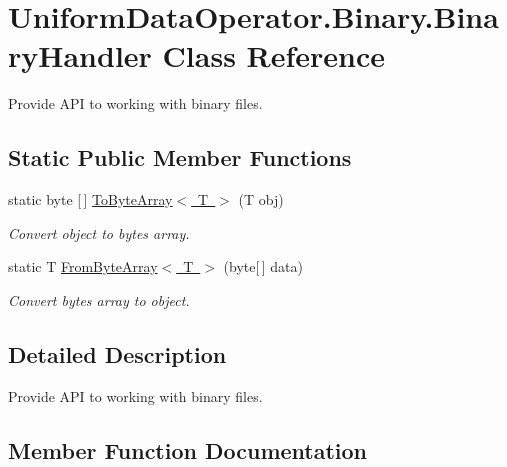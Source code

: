 \hypertarget{class_uniform_data_operator_1_1_binary_1_1_binary_handler}{}\section{Uniform\+Data\+Operator.\+Binary.\+Binary\+Handler Class Reference}
\label{class_uniform_data_operator_1_1_binary_1_1_binary_handler}


Provide A\+PI to working with binary files.  


\subsection*{Static Public Member Functions}
\begin{DoxyCompactItemize}
\item 
static byte \mbox{[}$\,$\mbox{]} \mbox{\hyperlink{class_uniform_data_operator_1_1_binary_1_1_binary_handler_ab02d6e27dd8d96934cc6d08f3970b33d}{To\+Byte\+Array$<$ T $>$}} (T obj)
\begin{DoxyCompactList}\small\item\em Convert object to bytes array. \end{DoxyCompactList}\item 
static T \mbox{\hyperlink{class_uniform_data_operator_1_1_binary_1_1_binary_handler_a31772237797bd25f97b204b74289df70}{From\+Byte\+Array$<$ T $>$}} (byte\mbox{[}$\,$\mbox{]} data)
\begin{DoxyCompactList}\small\item\em Convert bytes array to object. \end{DoxyCompactList}\end{DoxyCompactItemize}


\subsection{Detailed Description}
Provide A\+PI to working with binary files. 



\subsection{Member Function Documentation}
\mbox{\label{class_uniform_data_operator_1_1_binary_1_1_binary_handler_a31772237797bd25f97b204b74289df70}} 
